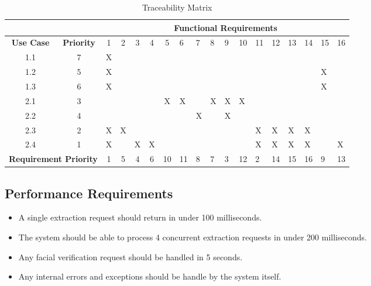 \documentclass{article}
\begin{document}
		\begin{table}[h]
\centering
\caption{Traceability Matrix}
\label{my-label}
\begin{tabular}{cc|c|c|c|c|c|l|l|l|l|l|l|l|l|l|l|l|}
\cline{3-18}
                                        &                   & \multicolumn{16}{c|}{\textbf{Functional Requirements}}                 \\ \hline
\multicolumn{1}{|c|}{\textbf{Use Case}} & \textbf{Priority} & 1 & 2 & 3 & 4 & 5  & 6  & 7 & 8 & 9 & 10 & 11 & 12 & 13 & 14 & 15 & 16 \\ \hline
\multicolumn{1}{|c|}{1.1}               & 7                 & X &   &   &   &    &    &   &   &   &    &    &    &    &    &    &    \\ \hline
\multicolumn{1}{|c|}{1.2}               & 5                 & X &   &   &   &    &    &   &   &   &    &    &    &    &    & X  &    \\ \hline
\multicolumn{1}{|c|}{1.3}               & 6                 & X &   &   &   &    &    &   &   &   &    &    &    &    &    & X  &    \\ \hline
\multicolumn{1}{|c|}{2.1}               & 3                 &   &   &   &   & X  & X  &   & X & X & X  &    &    &    &    &    &    \\ \hline
\multicolumn{1}{|c|}{2.2}               & 4                 &   &   &   &   &    &    & X &   & X &    &    &    &    &    &    &    \\ \hline
\multicolumn{1}{|c|}{2.3}               & 2                 & X & X &   &   &    &    &   &   &   &    & X  & X  & X  & X  &    &    \\ \hline
\multicolumn{1}{|c|}{2.4}               & 1                 & X &   & X & X &    &    &   &   &   &    & X  & X  & X  & X  &    & X  \\ \hline
\multicolumn{2}{|c|}{\textbf{Requirement Priority}}         & 1 & 5 & 4 & 6 & 10 & 11 & 8 & 7 & 3 & 12 & 2  & 14 & 15 & 16 & 9  & 13 \\ \hline
\end{tabular}
\end{table}
		
		
		
		\subsection{Performance Requirements}\label{subsec:specific-performance}
		\begin{itemize}
		\item A single extraction request should return in under 100 milliseconds.
		\item The system should be able to process 4 concurrent extraction requests in under 200 milliseconds.
		\item Any facial verification request should be handled in 5 seconds.
		    \item Any internal errors and exceptions should be handle by the system itself.
		\end{itemize}
\end{document}
